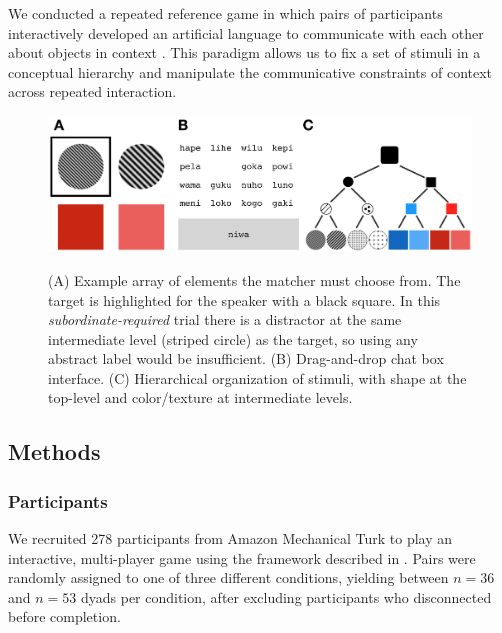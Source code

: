 \documentclass[10pt,letterpaper]{article}
\begin{document}
We conducted a repeated reference game in which pairs of participants interactively developed an artificial language to communicate with each other about objects in context \cite{WintersKirbySmith14_LanguagesAdapt, GalantucciGarrod11_ExperimentalSemiotics}. This paradigm allows us to fix a set of stimuli in a conceptual hierarchy and manipulate the communicative constraints of context across repeated interaction.

\begin{figure}[t]
\begin{center}
{\includegraphics[scale=.65]{fig.png}}
{\caption{{(A) Example array of elements the matcher must choose from. The target is highlighted for the speaker with a black square. In this \emph{subordinate-required} trial there is a distractor at the same intermediate level (striped circle) as the target, so using any abstract label would be insufficient. (B) Drag-and-drop chat box interface. (C) Hierarchical organization of stimuli, with shape at the top-level and color/texture at intermediate levels.  \label{exp}}}}
\end{center}
\end{figure}

\subsection{Methods}
\subsubsection{Participants}

We recruited 278 participants from Amazon Mechanical Turk to play an interactive, multi-player game using the framework described in . Pairs were randomly assigned to one of three different conditions, yielding between $n=36$ and $n=53$ dyads per condition, after excluding participants who disconnected before completion.
\end{document}
